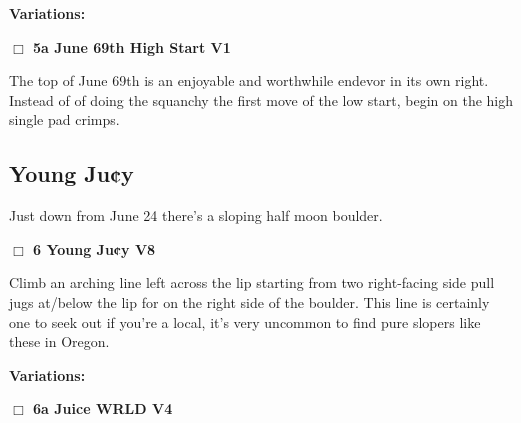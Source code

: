 \begin{multicols}{2}
\begin{adjustwidth}{0.5cm}{}				
\needspace{4em}
\textbf{Variations:} \newline

\needspace{2em}
\label{vr:June 69th High Start}
\colorbox{green!20}{
\parbox{0.95\linewidth}{
\hspace{-1ex}\textbf{$\Box$
5a June 69th High Start V1  
}}}
\begin{adjustwidth}{1.3em}{}			

The top of June 69th is an enjoyable and worthwhile endevor in its own right. Instead of of doing the squanchy the first move of the low start, begin on the high single pad crimps.
\end{adjustwidth}



\end{adjustwidth}



\needspace{10em}
\subsection*{Young Ju¢y}\label{bf:Young Ju¢y}

Just down from June 24 there's a sloping half moon boulder.\\



\needspace{2em}
\label{rt:Young Ju¢y}
\colorbox{Goldenrod!20}{
\parbox{0.95\linewidth}{
\hspace{-1ex}\textbf{$\Box$
6 Young Ju¢y V8  
}}}
\begin{adjustwidth}{1.3em}{}			

Climb an arching line left across the lip starting from two right-facing side pull jugs at/below the lip for on the right side of the boulder. This line is certainly one to seek out if you're a local, it's very uncommon to find pure slopers like these in Oregon.
\end{adjustwidth}


\begin{adjustwidth}{0.5cm}{}				
\needspace{4em}
\textbf{Variations:} \newline

\needspace{2em}
\label{vr:Juice WRLD}
\colorbox{RoyalBlue!20}{
\parbox{0.95\linewidth}{
\hspace{-1ex}\textbf{$\Box$
6a Juice WRLD V4  
}}}
\begin{adjustwidth}{1.3em}{}			


\end{adjustwidth}
\end{adjustwidth}
\end{multicols}
